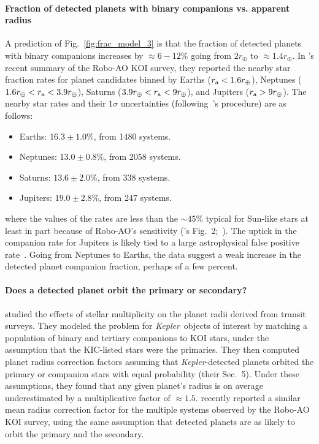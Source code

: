 \documentclass[12pt,modern]{aastex61}
\renewcommand{\a}{_{\rm a}}
\begin{document}
\paragraph{Fraction of detected planets with binary companions vs. apparent 
radius}
A prediction of Fig.~\ref{fig:frac_model_3} is that the fraction of detected 
planets with binary companions increases by $\approx 6-12\%$ going from 
$2r_\oplus$ to $\approx 1.4r_\oplus$.
In \citet{ziegler_robo-ao_2017}'s recent summary of the Robo-AO KOI survey, 
they reported the nearby star fraction rates for planet candidates binned by 
Earths ($r\a < 1.6r_\oplus$), Neptunes ($1.6r_\oplus < r\a < 3.9 r_\oplus$), 
Saturns ($3.9r_\oplus < r\a < 9 r_\oplus$), and Jupiters ($r\a > 9r_\oplus$).
The nearby star rates and their $1\sigma$ uncertainties 
(following~\cite{burgasser_binarity_2003}'s procedure) are as
follows:
\begin{itemize}
    \item Earths: $16.3 \pm 1.0\%$, from 1480 systems.
    \item Neptunes: $13.0 \pm 0.8\%$, from 2058 systems.
    \item Saturns: $13.6 \pm 2.0\%$, from 338 systems.
    \item Jupiters: $19.0 \pm 2.8\%$, from 247 systems.
\end{itemize} 
where the values of the rates are less than the $\sim 45\%$ typical for 
Sun-like stars at least in part because of Robo-AO's sensitivity 
(\citealt{ziegler_robo-ao_2017}'s Fig.~2;~\citealt{raghavan_survey_2010}).
The uptick in the companion rate for Jupiters is likely tied to a large 
astrophysical false positive rate~\citep{santerne_sophie_2012}.
Going from Neptunes to Earths, the data suggest a weak increase in the 
detected planet companion fraction, perhaps of a few percent.


\paragraph{Does a detected planet orbit the primary or secondary?}
\citet{ciardi_understanding_2015} studied the effects of stellar multiplicity 
on the planet radii derived from transit surveys.
They modeled the problem for {\it Kepler}\ objects of interest by matching a 
population of binary and tertiary companions to KOI stars, 
under the assumption that the KIC-listed stars were the primaries.
They then computed planet radius correction factors assuming that {\it 
    Kepler}-detected planets orbited the primary or companion stars
with equal probability (their Sec.~5).
Under these assumptions, they found that any given planet's radius is on 
average underestimated by a multiplicative factor of $\approx\! 1.5$.
\citet{ziegler_robo-ao_2017} recently reported a similar mean radius 
correction factor for the multiple systems observed by the Robo-AO KOI survey, 
using the same assumption that detected planets are as likely to orbit the 
primary and the secondary.
\end{document}
